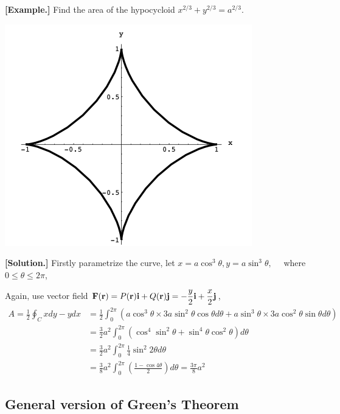 \documentclass[11pt, a4paper]{MATH2023}
\newcommand{\eg}{\textbf{[Example.] }}
\newcommand{\sol}{\textbf{[Solution.] }}
\newcommand{\ii}{{\bf i}}
\newcommand{\jj}{{\bf j}}
\newcommand{\rr}{{\bf r}}
\newcommand{\FF}{{\bf F}}
\begin{document}
\begin{spacing}{1.3}
    \vspace{\fill}
    \eg Find the area of the hypocycloid $x^{2 / 3}+y^{2 / 3}=a^{2 / 3}$.
    \begin{center}
        \includegraphics[scale=0.55]{images/Ch16-green-area-eg2.png}
    \end{center}

    \sol 
    Firstly parametrize the curve, 
    let $x=a \cos ^{3} \theta, y=a \sin ^{3} \theta, \quad$ where $0 \leqslant \theta \leqslant 2 \pi$,

    Again, use vector field $\disp \FF(\rr)=P(\rr)\ii+Q(\rr)\jj=-\frac{y}{2}\ii+\frac{x}{2}\jj$,
    \begin{align*}
        A=\frac{1}{2} \oint_{C} x d y-y d x &=\frac{1}{2} \int_{0}^{2 \pi}\left(a \cos ^{3} \theta \times 3 a \sin ^{2} \theta \cos \theta d \theta+a \sin ^{3} \theta \times 3 a \cos ^{2} \theta \sin \theta d \theta\right) \\
        &=\frac{3}{2} a^{2} \int_{0}^{2 \pi}\left(\cos ^{4} \sin ^{2} \theta+\sin ^{4} \theta \cos ^{2} \theta\right) d \theta \\
        &=\frac{3}{2} a^{2} \int_{0}^{2 \pi} \frac{1}{4} \sin ^{2} 2 \theta d \theta \\
        &=\frac{3}{8} a^{2} \int_{0}^{2 \pi}\left(\frac{1-\cos 4 \theta}{2}\right) d \theta=\frac{3 \pi}{8} a^{2}
    \end{align*}



    \newpage
    \subsection{General version of Green’s Theorem}


\end{spacing}
\end{document}
